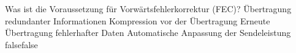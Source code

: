     {Was ist die Voraussetzung für Vorwärtsfehlerkorrektur (FEC)?}
    {Übertragung redundanter Informationen}
    {Kompression vor der Übertragung}
    {Erneute Übertragung fehlerhafter Daten}
    {Automatische Anpassung der Sendeleistung}
    {false}{false}